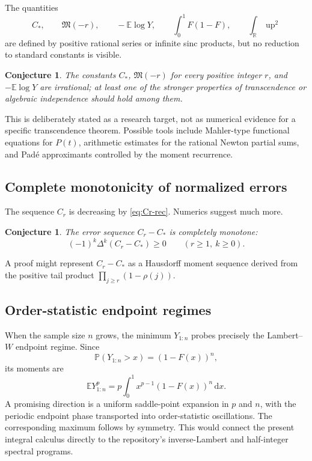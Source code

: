 \documentclass[11pt,oneside]{article}
\newtheorem{conjecture}[theorem]{Conjecture}
\theoremstyle{definition}
\newcommand{\F}{F}
\newcommand{\upf}{\operatorname{up}}
\newcommand{\M}{\mathfrak M}
\newcommand{\E}{\mathbb E}
\newcommand{\Prob}{\mathbb P}
\newcommand{\R}{\mathbb R}
\newcommand{\dd}{\,\mathrm d}
\begin{document}
The quantities
\begin{equation}\label{eq:new-constants}
 C_*,\qquad \M(-r),\qquad -\E\log Y,
 \qquad \int_0^1\F(1-\F),\qquad \int_\R\upf^2
\end{equation}
are defined by positive rational series or infinite sinc products, but no reduction to
standard constants is visible.

\begin{conjecture}\label{conj:irrationality}
The constants \(C_*\), \(\M(-r)\) for every positive integer \(r\), and
\(-\E\log Y\) are irrational; at least one of the stronger properties of
transcendence or algebraic independence should hold among them.
\end{conjecture}

This is deliberately stated as a research target, not as numerical evidence for a
specific transcendence theorem.  Possible tools include Mahler-type functional
equations for \(P(t)\), arithmetic estimates for the rational Newton partial sums, and
Pad\'e approximants controlled by the moment recurrence.

\subsection{Complete monotonicity of normalized errors}

The sequence \(C_r\) is decreasing by \cref{eq:Cr-rec}.  Numerics suggest much more.

\begin{conjecture}\label{conj:complete-monotone}
The error sequence \(C_r-C_*\) is completely monotone:
\begin{equation}\label{eq:complete-monotone-conj}
 (-1)^k\Delta^k(C_r-C_*)\ge0
 \qquad(r\ge1,\ k\ge0).
\end{equation}
\end{conjecture}

A proof might represent \(C_r-C_*\) as a Hausdorff moment sequence derived from the
positive tail product \(\prod_{j\ge r}(1-\rho(j))\).

\subsection{Order-statistic endpoint regimes}

When the sample size \(n\) grows, the minimum \(Y_{1:n}\) probes precisely the
Lambert--\(W\) endpoint regime.  Since
\[
 \Prob(Y_{1:n}>x)=(1-\F(x))^n,
\]
its moments are
\begin{equation}\label{eq:min-order-moment}
 \E Y_{1:n}^p=p\int_0^1x^{p-1}(1-\F(x))^n\dd x.
\end{equation}
A promising direction is a uniform saddle-point expansion in \(p\) and \(n\), with the
periodic endpoint phase transported into order-statistic oscillations.  The corresponding
maximum follows by symmetry.  This would connect the present integral calculus directly
to the repository's inverse-Lambert and half-integer spectral programs.
\end{document}
